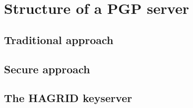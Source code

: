 
\section{Structure of a PGP server}
\newpage

\subsection{Traditional approach}

\subsection{Secure approach}
\newpage

\subsection{The HAGRID keyserver}
\label{sec:hagrid_structure}
\newpage
